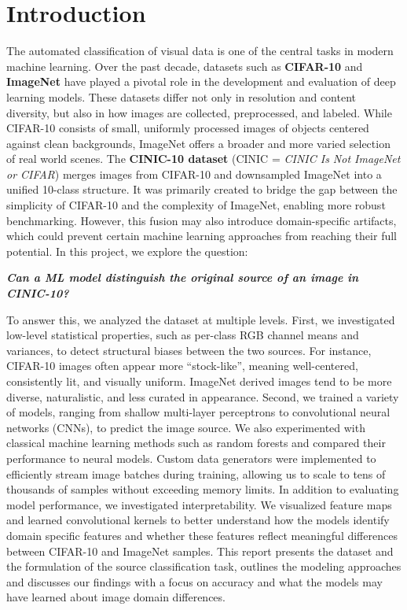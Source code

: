 \section{Introduction}

The automated classification of visual data is one of the central tasks in modern machine learning. Over the past decade, datasets such as \textbf{CIFAR-10} and \textbf{ImageNet} have played a 
pivotal role in the development and evaluation of deep learning models. These datasets differ not only in resolution and content diversity, but also in how images are collected, 
preprocessed, and labeled. While CIFAR-10 consists of small, uniformly processed images of objects centered against clean backgrounds, ImageNet offers a broader and more varied selection 
of real world scenes.
The \textbf{CINIC-10 dataset} (CINIC = \textit{CINIC Is Not ImageNet or CIFAR}) merges images from CIFAR-10 and downsampled ImageNet into a unified 10-class structure. 
It was primarily created to bridge the gap between the simplicity of CIFAR-10 and the complexity of ImageNet, enabling more robust benchmarking. However, this fusion may also 
introduce domain-specific artifacts, which could prevent certain machine learning approaches from reaching their full potential.
In this project, we explore the question:
\begin{center}
\textbf{\textit{Can a ML model distinguish the original source of an image in CINIC-10?}}
\end{center}
To answer this, we analyzed the dataset at multiple levels. First, we investigated low-level statistical properties, such as per-class RGB channel means and variances, to detect structural 
biases between the two sources. For instance, CIFAR-10 images often appear more ``stock-like'', meaning well-centered, consistently lit, and visually uniform. ImageNet derived images tend 
to be more diverse, naturalistic, and less curated in appearance.
Second, we trained a variety of models, ranging from shallow multi-layer perceptrons to convolutional neural networks (CNNs), to predict the image source. 
We also experimented with classical machine learning methods such as random forests and compared their performance to neural models. 
Custom data generators were implemented to efficiently stream image batches during training, allowing us to scale to tens of thousands of samples without exceeding memory limits.
In addition to evaluating model performance, we investigated interpretability. We visualized feature maps and learned convolutional kernels to better understand how the models identify 
domain specific features and whether these features reflect meaningful differences between CIFAR-10 and ImageNet samples.
This report presents the dataset and the formulation of the source classification task, outlines the modeling approaches and discusses our findings with a 
focus on accuracy and what the models may have learned about image domain differences.
